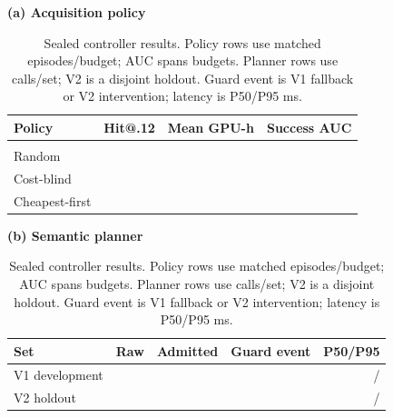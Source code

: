 \begin{table}[t]
\centering
\caption{Sealed controller results.  Policy rows use
\BudgetEpisodesPerPoint{} matched episodes/budget; AUC spans \BudgetLevels{}
budgets.  Planner rows use \PlannerCallsPerSet{} calls/set; V2 is a disjoint
holdout.  Guard event is V1 fallback or V2 intervention; latency is P50/P95 ms.}
\label{tab:agent-results}
\footnotesize
\setlength{\tabcolsep}{3.0pt}
\textbf{(a) Acquisition policy}\par\vspace{2pt}
\begin{tabular}{lrrr}
\toprule
Policy & Hit@.12 & Mean GPU-h & Success AUC \\
\midrule
\ipig{} & \IPIGOracleHit{} & \IPIGGPUHours{} & \IPIGSuccessAUC{} \\
Random & \RandomOracleHit{} & \RandomGPUHours{} & \RandomSuccessAUC{} \\
Cost-blind & \CostBlindOracleHit{} & \CostBlindGPUHours{} & \CostBlindSuccessAUC{} \\
Cheapest-first & \CheapestOracleHit{} & \CheapestGPUHours{} & \CheapestSuccessAUC{} \\
\bottomrule
\end{tabular}
\par\vspace{2pt}
\textbf{(b) Semantic planner}\par\vspace{2pt}
\begin{tabular}{lrrrr}
\toprule
Set & Raw & Admitted & Guard event & P50/P95 \\
\midrule
V1 development & \PlannerVoneRaw{} & \PlannerVoneAdmitted{} &
\PlannerVoneFallback{} & \PlannerVoneMedianLatency{}/\PlannerVonePninetyfiveLatency{} \\
V2 holdout & \PlannerVtwoRaw{} & \PlannerVtwoAdmitted{} &
\PlannerVtwoIntervention{} & \PlannerVtwoMedianLatency{}/\PlannerVtwoPninetyfiveLatency{} \\
\bottomrule
\end{tabular}
\end{table}
